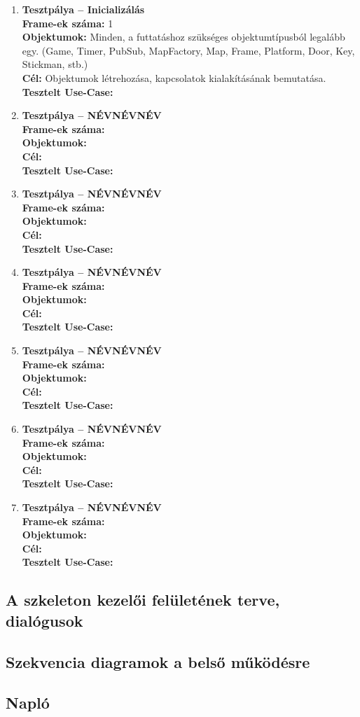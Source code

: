 		\begin{enumerate}[label=\textbf{\arabic*.}, start=0]
		
			\newcommand{\testitem}[1]{\item \textbf{Tesztpálya -- #1}\\}
			\newcommand{\tframe}[1]{\textbf{Frame-ek száma:} #1\\}
			\newcommand{\tobjekt}[1]{\textbf{Objektumok:} #1\\}
			\newcommand{\tcel}[1]{\textbf{Cél:} #1\\}
			\newcommand{\tuse}[1]{\textbf{Tesztelt Use-Case:} #1\\}
		
			\testitem{Inicializálás}
				\tframe{1}
				\tobjekt{Minden, a futtatáshoz szükséges objektumtípusból legalább egy.
					(Game, Timer, PubSub, MapFactory, Map, Frame, Platform, Door, Key, Stickman, stb.)}
				\tcel{Objektumok létrehozása, kapcsolatok kialakításának bemutatása.}
				\tuse{} 
			\testitem{NÉVNÉVNÉV}
				\tframe{}
				\tobjekt{}
				\tcel{} 
				\tuse{}
			\testitem{NÉVNÉVNÉV}
				\tframe{}
				\tobjekt{}
				\tcel{} 
				\tuse{}
			\testitem{NÉVNÉVNÉV}
				\tframe{}
				\tobjekt{}
				\tcel{} 
				\tuse{}
			\testitem{NÉVNÉVNÉV}
				\tframe{}
				\tobjekt{}
				\tcel{} 
				\tuse{}
			\testitem{NÉVNÉVNÉV}
				\tframe{}
				\tobjekt{}
				\tcel{} 
				\tuse{}
			\testitem{NÉVNÉVNÉV}
				\tframe{}
				\tobjekt{}
				\tcel{} 
				\tuse{} 
		\end{enumerate}
	
	\subsection{A szkeleton kezelői felületének terve, dialógusok}
	
	\subsection{Szekvencia diagramok a belső működésre}
	
	\subsection{Napló}

